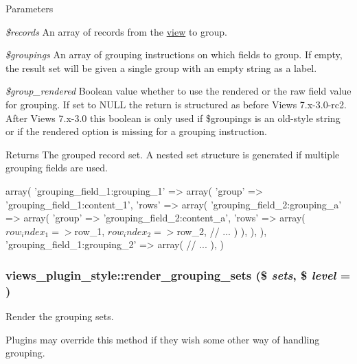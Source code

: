 \begin{DoxyParams}{Parameters}
\item[{\em \$records}]An array of records from the \hyperlink{classview}{view} to group. \item[{\em \$groupings}]An array of grouping instructions on which fields to group. If empty, the result set will be given a single group with an empty string as a label. \item[{\em \$group\_\-rendered}]Boolean value whether to use the rendered or the raw field value for grouping. If set to NULL the return is structured as before Views 7.x-\/3.0-\/rc2. After Views 7.x-\/3.0 this boolean is only used if \$groupings is an old-\/style string or if the rendered option is missing for a grouping instruction. \end{DoxyParams}
\begin{DoxyReturn}{Returns}
The grouped record set. A nested set structure is generated if multiple grouping fields are used.
\end{DoxyReturn}

\begin{DoxyCode}
   array(
     'grouping_field_1:grouping_1' => array(
       'group' => 'grouping_field_1:content_1',
       'rows' => array(
         'grouping_field_2:grouping_a' => array(
           'group' => 'grouping_field_2:content_a',
           'rows' => array(
             $row_index_1 => $row_1,
             $row_index_2 => $row_2,
             // ...
           )
         ),
       ),
     ),
     'grouping_field_1:grouping_2' => array(
       // ...
     ),
   )
\end{DoxyCode}
 \hypertarget{classviews__plugin__style_a1bbda7f308843509a043f5a0b10a90a8}{
\subsubsection[{render\_\-grouping\_\-sets}]{\setlength{\rightskip}{0pt plus 5cm}views\_\-plugin\_\-style::render\_\-grouping\_\-sets (\$ {\em sets}, \/  \$ {\em level} = {})}}
\label{classviews__plugin__style_a1bbda7f308843509a043f5a0b10a90a8}
Render the grouping sets.

Plugins may override this method if they wish some other way of handling grouping.


